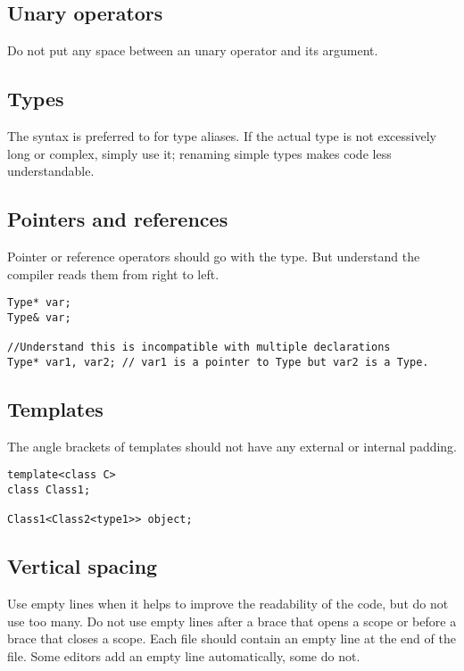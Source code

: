 \subsection{Unary operators}
Do not put any space between an unary operator and its argument.

\subsection{Types}
The  syntax is preferred to  for type aliases.
If the actual type is not excessively long or complex, simply use it; renaming simple types makes code less understandable.

\subsection{Pointers and references}
Pointer or reference operators should go with the type. But understand the compiler reads them from right to left.

\begin{lstlisting}
Type* var;
Type& var;

//Understand this is incompatible with multiple declarations
Type* var1, var2; // var1 is a pointer to Type but var2 is a Type.
\end{lstlisting}

\subsection{Templates}
The angle brackets of templates should not have any external or internal padding.
\begin{lstlisting}
template<class C>
class Class1;

Class1<Class2<type1>> object;
\end{lstlisting}

\subsection{Vertical spacing}
Use empty lines when it helps to improve the readability of the code, but do not use too many.
Do not use empty lines after a brace that opens a scope
or before a brace that closes a scope.
Each file should contain an empty line at the end of the file.
Some editors add an empty line automatically, some do not.

